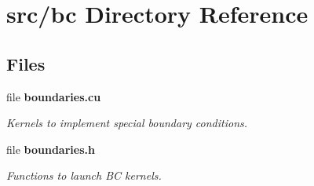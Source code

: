 \section{src/bc Directory Reference}
\label{dir_96f7c11e9d5d0b09f433cbf8fd37f2d0}
\subsection*{Files}
\begin{DoxyCompactItemize}
\item 
file {\bf boundaries.\-cu}
\begin{DoxyCompactList}\small\item\em Kernels to implement special boundary conditions. \end{DoxyCompactList}\item 
file {\bf boundaries.\-h}
\begin{DoxyCompactList}\small\item\em Functions to launch B\-C kernels. \end{DoxyCompactList}\end{DoxyCompactItemize}
